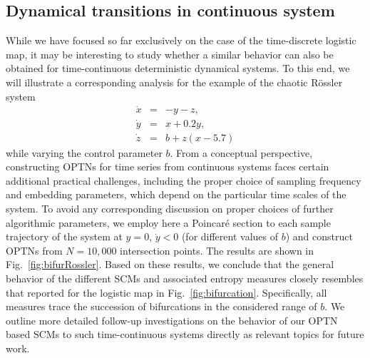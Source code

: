 \documentclass[12pt,aip,cha,reprint,nofootinbib]{revtex4-1}
\begin{document}
\subsection{Dynamical transitions in continuous system}\label{sec:cont}

While we have focused so far exclusively on the case of the time-discrete logistic map, it may be interesting to study whether a similar behavior can also be obtained for time-continuous deterministic dynamical systems. To this end, we will illustrate a corresponding analysis for the example of the chaotic R\"ossler system \cite{Roessler1976} 
\begin{eqnarray}
\dot{x} &=& -y-z, \nonumber \\
\dot{y} &=& x+0.2y, \\
\dot{z} &=& b+z(x-5.7) \nonumber
\end{eqnarray}
while varying the control parameter $b$. From a conceptual perspective, constructing OPTNs for time series from continuous systems faces certain additional practical challenges, including the proper choice of sampling frequency and embedding parameters, which depend on the particular time scales of the system. To avoid any corresponding discussion on proper choices of further algorithmic parameters, we employ here a Poincar\'e section to each sample trajectory of the system at $y=0$, $\dot{y}<0$ (for different values of $b$) and construct OPTNs from $N = 10,000$ intersection points. The results are shown in Fig.~\ref{fig:bifurRossler}. Based on these results, we conclude that the general behavior of the different SCMs and associated entropy measures closely resembles that reported for the logistic map in Fig.~\ref{fig:bifurcation}. Specifically, all measures trace the succession of bifurcations in the considered range of $b$. We outline more detailed follow-up investigations on the behavior of our OPTN based SCMs to such time-continuous systems directly as relevant topics for future work.
\end{document}
